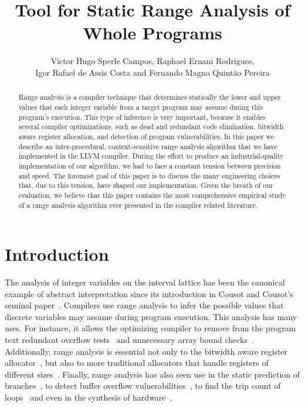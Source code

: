 \documentclass{paper}
\begin{document}
\lstset{language=, basicstyle=\small} 

\title{Tool for Static Range Analysis of Whole Programs}

\author{Victor Hugo Sperle Campos, Raphael Ernani Rodrigues, \\
Igor Rafael de Assis Costa and Fernando Magno Quint\~{a}o Pereira}

\address{UFMG -- 6627 Ant\^{o}nio Carlos Av, 31.270-010, Belo Horizonte, Brazil
}


\maketitle

\begin{abstract}
Range analysis is a compiler technique that determines statically the lower and
upper values that each integer variable from a target program may assume
during this program's execution.
This type of inference is very important, because it enables several compiler
optimizations, such as dead and redundant code elimination, bitwidth aware
register allocation, and detection of program vulnerabilities.
In this paper we describe an inter-procedural, context-sensitive range analysis
algorithm that we have implemented in the LLVM compiler.
During the effort to produce an industrial-quality implementation of our
algorithm, we had to face a constant tension between precision and speed.
The foremost goal of this paper is to discuss the many engineering choices
that, due to this tension, have shaped our implementation.
Given the breath of our evaluation, we believe that this paper
contains the most comprehensive empirical study of a range analysis
algorithm ever presented in the compiler related literature.
\end{abstract}

\section{Introduction}
\label{sec:intro}

The analysis of integer variables on the interval lattice has been the
canonical example of abstract interpretation since its introduction in
Cousot and Cousot's seminal paper~\cite{Cousot77}.
Compilers use range analysis to infer the possible values that discrete
variables may assume during program execution.
This analysis has many uses.
For instance, it allows the optimizing compiler to remove from the program text
redundant overflow tests~\cite{Sol11} and unnecessary array bound
checks~\cite{Bodik00}.
Additionally, range analysis is essential not only to the bitwidth aware
register allocator~\cite{Barik06,Tallam03}, but also to more traditional
allocators that handle registers of different
sizes~\cite{Kong98,Pereira08,Scholz02}.
Finally, range analysis has also seen use in the static prediction of
branches~\cite{Patterson95}, to detect buffer overflow
vulnerabilities~\cite{Simon08,Wagner00}, to find the trip count of
loops~\cite{Lokuciejewski09}
and even in the synthesis of hardware~\cite{Cong05,Lhairech10,Mahlke01}.
\end{document}
